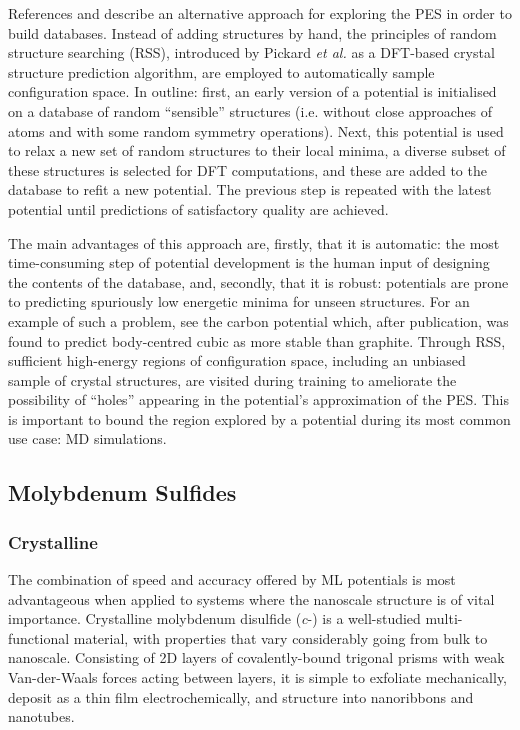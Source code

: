 \documentclass[12pt,a4paper,twoside,nobind]{ociamthesis}
\begin{document}
References \cite{Deringer2018} and \cite{Bernstein2019b} describe an alternative approach for exploring the PES in order to build databases.
Instead of adding structures by hand, the principles of random structure searching (RSS), introduced by Pickard \emph{et al.} as a DFT-based crystal structure prediction algorithm,
are employed to automatically sample configuration space.\autocite{Pickard2006,Pickard2011} 
In outline: first, an early version of a potential is initialised on a database of random ``sensible''  structures (i.e. without close approaches of atoms and with some random
symmetry operations). 
Next, this potential is used to relax a new set of random structures to their local minima, a diverse subset of these structures is selected for DFT computations,
and these are added to the database to refit a new potential. 
The previous step is repeated with the latest potential until predictions of satisfactory quality are achieved.

The main advantages of this approach are, firstly, that it is automatic: the most time-consuming step of potential development is the human input of designing the contents of the database,
and, secondly, that it is robust: potentials are prone to predicting spuriously low energetic minima for unseen structures. For an example of such a problem, see the carbon potential\autocite{Rowe2022} which, after publication,
was found to predict body-centred cubic as more stable than graphite. %
Through RSS, sufficient high-energy regions of configuration space, including an unbiased sample of crystal structures, are visited during training to ameliorate the possibility of ``holes'' appearing in the potential's approximation of the PES.
This is important to bound the region explored by a potential during its most common use case: MD simulations.
% 
%

\subsection{Molybdenum Sulfides}

\subsubsection*{Crystalline }
The combination of speed and accuracy offered by ML potentials is most advantageous when applied to systems
where the nanoscale structure is of vital importance.
Crystalline molybdenum disulfide (\textit{c}-) is a well-studied multi-functional material, with properties that 
vary considerably going from bulk to nanoscale.\autocite{Ganatra2014} Consisting of 2D layers of covalently-bound  trigonal prisms with weak Van-der-Waals forces acting between layers,
it is simple to exfoliate mechanically, deposit as a thin film electrochemically, and structure into nanoribbons and nanotubes. 
\end{document}
